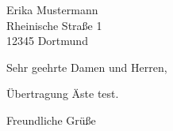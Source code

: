 \documentclass[version=last, Briefvorlage]{scrlttr2}
\begin{document}
%
\begin{letter}{%
		Erika Mustermann\\
		Rheinische Straße 1\\
		12345 Dortmund%
	}
	\opening{Sehr geehrte Damen und Herren,}
	Übertragung Äste test.
	\closing{Freundliche Grüße}
\end{letter}
%
\end{document}
